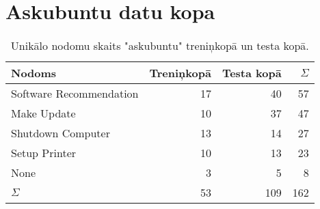 



\section{Askubuntu datu kopa}

\begin{table}[htbp]
  \centering
  \caption{Unikālo nodomu skaits "askubuntu" treniņkopā un testa kopā.}
    \begin{tabular}{lrrr} \toprule
    Nodoms & Treniņkopā & Testa kopā & $\Sigma$ \\\midrule
    Software Recommendation & 17    & 40 & 57 \\
    Make Update & 10    & 37 & 47 \\
    Shutdown Computer & 13    & 14 & 27 \\
    Setup Printer & 10    & 13 & 23\\
    None  & 3     & 5 & 8\\
   $\Sigma$ & 53    & 109 & 162 \\\bottomrule
    \end{tabular}%
  \label{tab:askubuntu-labels}%
\end{table}%




